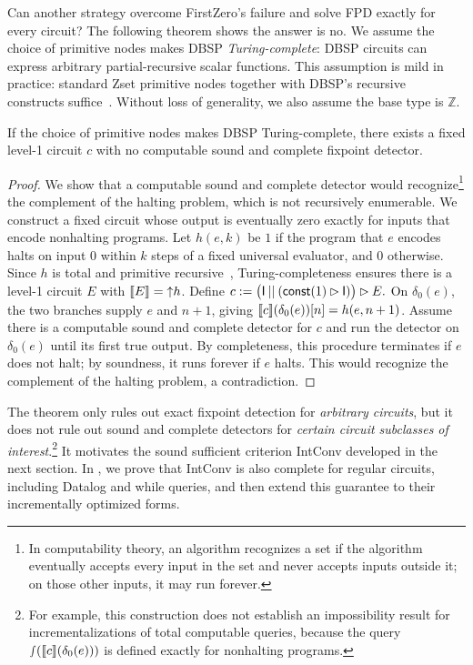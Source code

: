 Can another strategy overcome FirstZero's failure and solve FPD exactly for every circuit? The following theorem shows the answer is no. We assume the choice of primitive nodes makes DBSP \emph{Turing-complete}: DBSP circuits can express arbitrary partial-recursive scalar functions. This assumption is mild in practice: standard Zset primitive nodes together with DBSP's recursive constructs suffice~\cite[\S7.2]{budiu2025dbsp}. Without loss of generality, we also assume the base type is \(\mathbb Z\).

\begin{theorem}\label{thm:fpd-undecidability}
    If the choice of primitive nodes makes DBSP Turing-complete, there exists a fixed level-1 circuit $c$ with no computable sound and complete fixpoint detector.
\end{theorem}
\begin{proof}
    We show that a computable sound and complete detector would recognize\footnote{In computability theory, an algorithm recognizes a set if the algorithm eventually accepts every input in the set and never accepts inputs outside it; on those other inputs, it may run forever.} the complement of the halting problem, which is not recursively enumerable. We construct a fixed circuit whose output is eventually zero exactly for inputs that encode nonhalting programs. Let $h(e,k)$ be $1$ if the program that $e$ encodes halts on input $0$ within $k$ steps of a fixed universal evaluator, and $0$ otherwise. Since $h$ is total and primitive recursive~\cite[\S5.2]{carneiro2019computability}, Turing-completeness ensures there is a level-1 circuit $E$ with $\llbracket E \rrbracket={\uparrow}h$. Define
    \(
        c := \bigl(\mathsf{I} \mathbin{||} (\mathsf{const}(1) \mathbin{\vartriangleright} \mathsf{I})\bigr) \mathbin{\vartriangleright} E.
    \)
    On $\delta_0(e)$, the two branches supply $e$ and $n+1$, giving $\llbracket c \rrbracket(\delta_0(e))[n]=h(e,n+1)$. Assume there is a computable sound and complete detector for $c$ and run the detector on \(\delta_0(e)\) until its first true output. By completeness, this procedure terminates if \(e\) does not halt; by soundness, it runs forever if \(e\) halts. This would recognize the complement of the halting problem, a contradiction.
\end{proof}

The theorem only rules out exact fixpoint detection for \emph{arbitrary circuits}, but it does not rule out sound and complete detectors for \emph{certain circuit subclasses of interest}.\footnote{For example, this construction does not establish an impossibility result for incrementalizations of total computable queries, because the query \(\smallint(\llbracket c\rrbracket(\delta_0(e)))\) is defined exactly for nonhalting programs.} It motivates the sound sufficient criterion IntConv developed in the next section. In , we prove that IntConv is also complete for regular circuits, including Datalog and while queries, and then extend this guarantee to their incrementally optimized forms.
